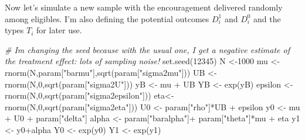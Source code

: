 \documentclass[
]{book}
\newenvironment{Shaded}{\begin{snugshade}}{\end{snugshade}}
\newcommand{\CommentTok}[1]{\textcolor[rgb]{0.56,0.35,0.01}{\textit{#1}}}
\newcommand{\DecValTok}[1]{\textcolor[rgb]{0.00,0.00,0.81}{#1}}
\newcommand{\FunctionTok}[1]{\textcolor[rgb]{0.00,0.00,0.00}{#1}}
\newcommand{\NormalTok}[1]{#1}
\newcommand{\OtherTok}[1]{\textcolor[rgb]{0.56,0.35,0.01}{#1}}
\newcommand{\SpecialCharTok}[1]{\textcolor[rgb]{0.00,0.00,0.00}{#1}}
\newcommand{\StringTok}[1]{\textcolor[rgb]{0.31,0.60,0.02}{#1}}
\theoremstyle{definition}
\theoremstyle{definition}
\theoremstyle{definition}
\theoremstyle{definition}
\theoremstyle{remark}
\begin{document}
Now let's simulate a new sample with the encouragement delivered randomly among eligibles.
I'm also defining the potential outcomes \(D^1_i\) and \(D^0_i\) and the types \(T_i\) for later use.

\begin{Shaded}
\begin{Highlighting}[]
\CommentTok{\# I\textquotesingle{}m changing the seed because with the usual one, I get a negative estimate of the treatment effect: lots of sampling noise!}
\FunctionTok{set.seed}\NormalTok{(}\DecValTok{12345}\NormalTok{)}
\NormalTok{N }\OtherTok{\textless{}{-}}\DecValTok{1000}
\NormalTok{mu }\OtherTok{\textless{}{-}} \FunctionTok{rnorm}\NormalTok{(N,param[}\StringTok{"barmu"}\NormalTok{],}\FunctionTok{sqrt}\NormalTok{(param[}\StringTok{"sigma2mu"}\NormalTok{]))}
\NormalTok{UB }\OtherTok{\textless{}{-}} \FunctionTok{rnorm}\NormalTok{(N,}\DecValTok{0}\NormalTok{,}\FunctionTok{sqrt}\NormalTok{(param[}\StringTok{"sigma2U"}\NormalTok{]))}
\NormalTok{yB }\OtherTok{\textless{}{-}}\NormalTok{ mu }\SpecialCharTok{+}\NormalTok{ UB }
\NormalTok{YB }\OtherTok{\textless{}{-}} \FunctionTok{exp}\NormalTok{(yB)}
\NormalTok{epsilon }\OtherTok{\textless{}{-}} \FunctionTok{rnorm}\NormalTok{(N,}\DecValTok{0}\NormalTok{,}\FunctionTok{sqrt}\NormalTok{(param[}\StringTok{"sigma2epsilon"}\NormalTok{]))}
\NormalTok{eta}\OtherTok{\textless{}{-}} \FunctionTok{rnorm}\NormalTok{(N,}\DecValTok{0}\NormalTok{,}\FunctionTok{sqrt}\NormalTok{(param[}\StringTok{"sigma2eta"}\NormalTok{]))}
\NormalTok{U0 }\OtherTok{\textless{}{-}}\NormalTok{ param[}\StringTok{"rho"}\NormalTok{]}\SpecialCharTok{*}\NormalTok{UB }\SpecialCharTok{+}\NormalTok{ epsilon}
\NormalTok{y0 }\OtherTok{\textless{}{-}}\NormalTok{ mu }\SpecialCharTok{+}\NormalTok{  U0 }\SpecialCharTok{+}\NormalTok{ param[}\StringTok{"delta"}\NormalTok{]}
\NormalTok{alpha }\OtherTok{\textless{}{-}}\NormalTok{ param[}\StringTok{"baralpha"}\NormalTok{]}\SpecialCharTok{+}\NormalTok{  param[}\StringTok{"theta"}\NormalTok{]}\SpecialCharTok{*}\NormalTok{mu }\SpecialCharTok{+}\NormalTok{ eta}
\NormalTok{y1 }\OtherTok{\textless{}{-}}\NormalTok{ y0}\SpecialCharTok{+}\NormalTok{alpha}
\NormalTok{Y0 }\OtherTok{\textless{}{-}} \FunctionTok{exp}\NormalTok{(y0)}
\NormalTok{Y1 }\OtherTok{\textless{}{-}} \FunctionTok{exp}\NormalTok{(y1)}


\end{Highlighting}
\end{Shaded}
\end{document}
